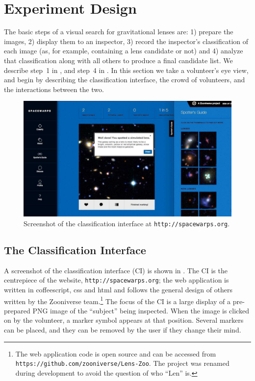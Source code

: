 \documentclass[useAMS,usenatbib,a4paper]{mn2e}
\begin{document}

\section{Experiment Design}
\label{sec:design}

The basic steps of a visual search for gravitational lenses are: 1) prepare
the images, 2) display them to an inspector, 3) record the inspector's
classification of each image (as, for example, containing a lens candidate or
not) and 4) analyze that classification along with all others to produce a
final candidate list. We describe step~1 in , and step~4 in
. In this section we take a volunteer's eye view, and begin by
describing the \SW classification interface, the crowd of volunteers, and the
interactions between the two.

\begin{figure}
\centering\includegraphics[width=0.9\linewidth]{sw-screengrab-marker+feedback.pdf}
\caption{Screenshot of the \SW classification interface at
  \texttt{http://spacewarps.org}.}
\label{fig:screenshot}
\end{figure}


\subsection{The Classification Interface}
\label{sec:design:interface}

A screenshot of the \SW classification interface (CI) is shown in
. The CI is the centrepiece of the \SW website,
\texttt{http://spacewarps.org}; the web application is written in coffeescript,
css and html and follows the general design of others written by the Zooniverse
team.\footnote{The \SW web application code is open source and can be accessed
from \texttt{https://github.com/zooniverse/Lens-Zoo}.  The project was renamed
during development to avoid the question of  who ``Len'' is.} The focus of the
CI is a large display of a pre-prepared PNG image of the ``subject'' being
inspected. When the image is clicked on by the volunteer, a marker symbol
appears at that position.  Several markers can be placed, and they can be
removed by the user if they change their mind.
\end{document}
